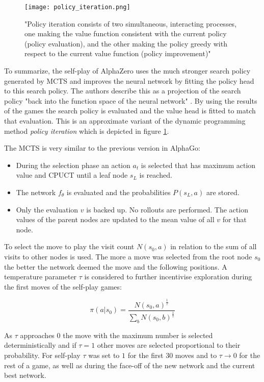 \begin{figure}
    \centering
    \texttt{[image: policy\_iteration.png]}
    \caption{"Policy iteration consists of two simultaneous, interacting processes, one making the value function consistent with the current policy (policy evaluation), and the other making the policy greedy with respect to the current value function (policy improvement)" \cite[86]{sutton_reinforcement_2018}}
    \label{policy_iteration}
\end{figure}

To summarize, the self-play of AlphaZero uses the much stronger search policy generated by MCTS and improves the neural network by fitting the policy head to this search policy. The authors describe this as a projection of the search policy "back into the function space of the neural network" \cite[p. 19]{silver_mastering_2017}. By using the results of the games the search policy is evaluated and the value head is fitted to match that evaluation. This is an approximate variant of the dynamic programming method \textit{policy iteration} which is depicted in figure \ref{policy_iteration}.

The MCTS is very similar to the previous version in AlphaGo:
\begin{itemize}
    \item During the selection phase an action $a_t$ is selected that has maximum action value and CPUCT until a leaf node $s_L$ is reached.
    \item The network $f_{\theta}$ is evaluated and the probabilities $P(s_L, a)$ are stored.
    \item Only the evaluation $v$ is backed up. No rollouts are performed. The action values of the parent nodes are updated to the mean value of all $v$ for that node.
\end{itemize}

To select the move to play the visit count $N(s_0, a)$ in relation to the sum of all visits to other nodes is used. The more a move was selected from the root node $s_0$ the better the network deemed the move and the following positions. A temperature parameter $\tau$ is considered to further incentivise exploration during the first moves of the self-play games:

\begin{equation}
    \pi(a|s_0) = \frac{N(s_0, a)^{\frac{1}{\tau}}}{\sum_b N(s_0, b)^{\frac{1}{\tau}}}
\end{equation}

As $\tau$ approaches $0$ the move with the maximum number is selected deterministically and if $\tau = 1$ other moves are selected proportional to their probability. For self-play $\tau$ was set to $1$ for the first 30 moves and to $\tau \rightarrow 0$ for the rest of a game, as well as during the face-off of the new network and the current best network.
